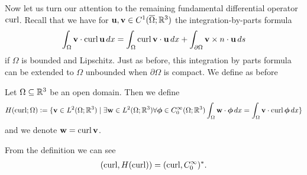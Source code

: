 \documentclass[../master_thesis.tex]{subfiles}
\begin{document}
Now let us turn our attention to the remaining fundamental differential operator 
$\operatorname{curl}$. Recall that we have for 
$\mathbf{u}, \mathbf{v} \in C^1(\overline{\Omega};\mathbb{R}^3)$ the integration-by-parts 
formula
\begin{align}
    \int_\Omega \mathbf{v} \cdot \operatorname{curl} \mathbf{u} \, dx 
    = \int_\Omega \operatorname{curl} \mathbf{v} \cdot \mathbf{u} \, dx 
        + \int_{\partial \Omega} \mathbf{v} \times n \cdot \mathbf{u} \, ds 
        \label{eq:integration_by_parts_curl_C1} 
\end{align}
if $\Omega$ is bounded and Lipschitz. Just as before, this integration by parts formula can 
be extended to $\Omega$ unbounded when $\partial \Omega$ is compact. 
We define as before 
\begin{definition}
    Let $\Omega \subseteq \mathbb{R}^3$ be an open domain. 
    Then we define 
    \begin{align*}
        H(\operatorname{curl};\Omega) \vcentcolon= \{ \mathbf{v} \in L^2(\Omega;\mathbb{R}^3)
        \mid \exists \mathbf{w} \in L^2(\Omega; \mathbb{R}^3) 
        \forall \boldsymbol{\phi} \in C_0^\infty(\Omega;\mathbb{R}^3)
        \int_\Omega \mathbf{w} \cdot \boldsymbol{\phi} \, dx 
        = \int_\Omega \mathbf{v} \cdot \operatorname{curl} \boldsymbol{\phi} \, dx \}
    \end{align*}
    and we denote $\mathbf{w} = \operatorname{curl} \mathbf{v}$.
\end{definition}
From the definition we can see
\begin{align*}
    (\operatorname{curl}, H(\operatorname{curl})) = (\operatorname{curl}, C_0^\infty)^*.
\end{align*}
\end{document}
